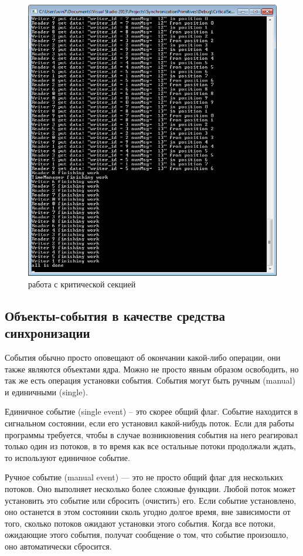 \documentclass[a4paper, 12pt]{article}		%
\begin{document}
\begin{figure}[h!]
\centering
\includegraphics[scale=1]{res/003}
\caption{работа с критической секцией}
\end{figure}

\newpage
\subsection{Объекты-события в качестве средства синхронизации}

События обычно просто оповещают об окончании какой-либо операции, они также являются объектами ядра. Можно не просто явным образом освободить, но так же есть операция установки события. События могут быть ручным (manual) и единичными (single).

Единичное событие (single event) – это скорее общий флаг. Событие находится в сигнальном состоянии, если его установил какой-нибудь поток. Если для работы программы требуется, чтобы в случае возникновения события на него реагировал только один из потоков, в то время как все остальные потоки продолжали ждать, то используют единичное событие.

Ручное событие (manual event) — это не просто общий флаг для нескольких потоков. Оно выполняет несколько более сложные функции. Любой поток может установить это событие или сбросить (очистить) его. Если событие установлено, оно останется в этом состоянии сколь угодно долгое время, вне зависимости от того, сколько потоков ожидают установки этого события. Когда все потоки, ожидающие этого события, получат сообщение о том, что событие произошло, оно автоматически сбросится.
\end{document}
